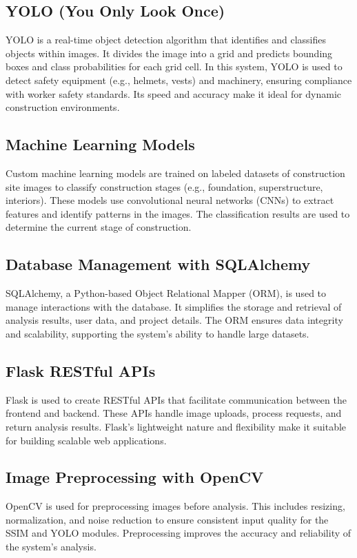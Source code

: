 \subsection{YOLO (You Only Look Once)}
YOLO is a real-time object detection algorithm that identifies and classifies objects within images. It divides the image into a grid and predicts bounding boxes and class probabilities for each grid cell. In this system, YOLO is used to detect safety equipment (e.g., helmets, vests) and machinery, ensuring compliance with worker safety standards. Its speed and accuracy make it ideal for dynamic construction environments.

\subsection{Machine Learning Models}
Custom machine learning models are trained on labeled datasets of construction site images to classify construction stages (e.g., foundation, superstructure, interiors). These models use convolutional neural networks (CNNs) to extract features and identify patterns in the images. The classification results are used to determine the current stage of construction.

\subsection{Database Management with SQLAlchemy}
SQLAlchemy, a Python-based Object Relational Mapper (ORM), is used to manage interactions with the database. It simplifies the storage and retrieval of analysis results, user data, and project details. The ORM ensures data integrity and scalability, supporting the system's ability to handle large datasets.

\subsection{Flask RESTful APIs}
Flask is used to create RESTful APIs that facilitate communication between the frontend and backend. These APIs handle image uploads, process requests, and return analysis results. Flask's lightweight nature and flexibility make it suitable for building scalable web applications.

\subsection{Image Preprocessing with OpenCV}
OpenCV is used for preprocessing images before analysis. This includes resizing, normalization, and noise reduction to ensure consistent input quality for the SSIM and YOLO modules. Preprocessing improves the accuracy and reliability of the system's analysis.

